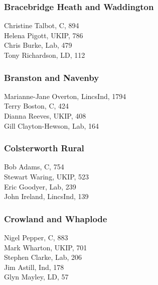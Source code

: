 \documentclass[a4paper,openany,10pt]{book}
\begin{document}
\subsubsection*{Bracebridge Heath and Waddington}



Christine Talbot, C, 894\\
Helena Pigott, UKIP, 786\\
Chris Burke, Lab, 479\\
Tony Richardson, LD, 112\\


\subsubsection*{Branston and Navenby}



{Marianne-Jane Overton}, LincsInd, 1794\\
Terry Boston, C, 424\\
Dianna Reeves, UKIP, 408\\
{Gill Clayton-Hewson}, Lab, 164\\


\subsubsection*{Colsterworth Rural}



Bob Adams, C, 754\\
Stewart Waring, UKIP, 523\\
Eric Goodyer, Lab, 239\\
John Ireland, LincsInd, 139\\


\subsubsection*{Crowland and Whaplode}



Nigel Pepper, C, 883\\
Mark Wharton, UKIP, 701\\
Stephen Clarke, Lab, 206\\
Jim Astill, Ind, 178\\
Glyn Mayley, LD, 57\\
\end{document}

